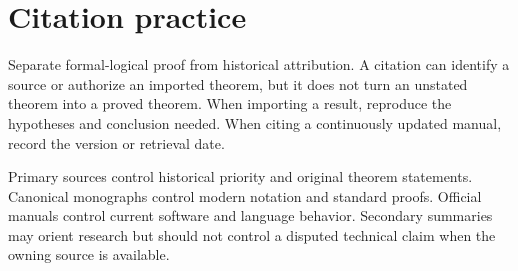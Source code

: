 \section{Citation practice}
\label{sec:latex-style-05}

Separate formal-logical proof from historical attribution.  A citation can
identify a source or authorize an imported theorem, but it does not turn an
unstated theorem into a proved theorem.  When importing a result, reproduce the
hypotheses and conclusion needed.  When citing a continuously updated manual,
record the version or retrieval date.

Primary sources control historical priority and original theorem statements.
Canonical monographs control modern notation and standard proofs.  Official
manuals control current software and language behavior.  Secondary summaries
may orient research but should not control a disputed technical claim when the
owning source is available.

